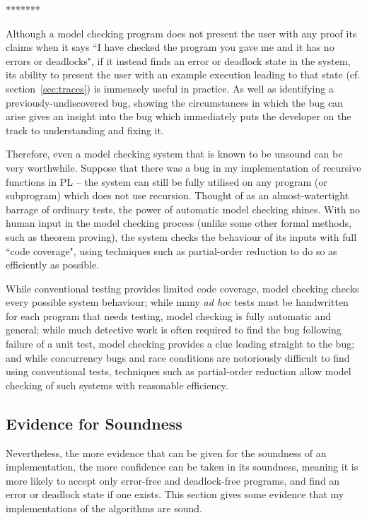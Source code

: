 \documentclass[12pt,a4paper,twoside,openright]{report}
\begin{document}
\begin{center}
	*******
\end{center}

Although a model checking  program does not present
the user with any proof its claims when
it says ``I have checked the program you
gave me and it has no errors or deadlocks",
if it instead finds an error or deadlock state
in the system, its ability to present the
user with an example execution leading
to that state (cf. section~\ref{sec:traces})
is immensely useful in practice. As well
as identifying a previously-undiscovered
bug, showing the circumstances in which
the bug can arise gives an insight into
the bug which immediately puts the
developer on the track to
understanding and fixing it.

Therefore, even a model checking system that
is known to be unsound can be very worthwhile.
Suppose that there was a bug in my implementation
of recursive functions in PL -- the system can
still be fully utilised on any program (or
subprogram) which does not use recursion.
Thought of as an almost-watertight barrage
of ordinary tests, the power of automatic
model checking shines. With no human input
in the model checking process (unlike some
other formal methods, such as theorem
proving), the system checks the behaviour
of its inputs with full ``code coverage",
using techniques such as partial-order
reduction to do so as efficiently as possible.

While conventional testing provides limited
code coverage, model checking checks every
possible system behaviour; while 
many \textit{ad hoc} tests must
be handwritten for each program that
needs testing, model checking is fully automatic
and general;
while much detective work is often required to find
the bug following failure of a unit test,
model checking provides a clue leading straight to
the bug; and while concurrency bugs and race
conditions are notoriously difficult to find
using conventional tests, techniques such
as partial-order reduction allow model
checking of such systems with reasonable
efficiency.

\subsection{Evidence for Soundness}
Nevertheless, the more evidence that
can be given for the soundness of an
implementation, the more confidence
can be taken in its soundness, meaning
it is more likely to accept only
error-free and deadlock-free programs,
and find an error or deadlock state
if one exists. This section gives
some evidence that my implementations
of the algorithms are sound.
\end{document}
